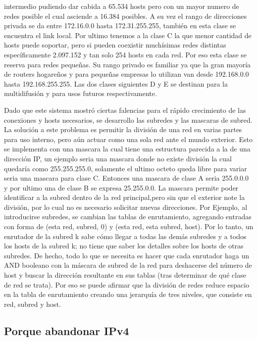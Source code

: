 \documentclass[11pt,a4paper]{article}
\begin{document}
intermedio pudiendo dar cabida a 65.534 hosts pero con un mayor numero de redes posible el cual 
asciende a 16.384 posibles. A su vez el rango de direcciones privada se da entre 172.16.0.0 hasta 
172.31.255.255, también en esta clase se encuentra el link local. Por ultimo tenemos a la clase C la
que menor cantidad de hosts puede soportar, pero si pueden coexistir muchísimas redes distintas 
específicamente 2.097.152 y tan solo 254 hosts en cada red. Por eso esta clase se reserva para redes 
pequeñas. Su rango privado es familiar ya que la gran mayoría de routers hogareños y para pequeñas 
empresas lo utilizan van desde 192.168.0.0 hasta 192.168.255.255. Las dos clases siguientes D y E se
destinan para la multidifusi\'on y para usos futuros respectivamente.\par
Dado que este sistema mostró ciertas falencias para el rápido crecimiento de las conexiones y hosts
necesarios, se desarrollo las subredes y las mascaras de subred. La solución a este problema es 
permitir la división de una red en varias partes para uso interno, pero aún actuar como una sola red 
ante el mundo exterior. Esto se implementa con una mascara la cual tiene una estructura parecida a
la de una dirección IP, un ejemplo seria una mascara donde no existe división la cual quedaría como 
255.255.255.0, solamente el ultimo octeto queda libre para variar seria una mascara para clase C. 
Entonces una mascara de clase A seria 255.0.0.0 y por ultimo una de clase B se expresa 25.255.0.0. 
La mascara permite poder identificar a la subred dentro de la red principal,pero sin que el exterior 
note la división, por lo cual no es necesario solicitar nuevas direcciones. Por Ejemplo, al 
introducirse subredes, se cambian las tablas de enrutamiento, agregando entradas con forma de (esta 
red, subred, 0) y (esta red, esta subred, host). Por lo tanto, un enrutador de la subred k sabe cómo 
llegar a todas las demás subredes y a todos los hosts de la subred k; no tiene que saber los 
detalles sobre los hosts de otras subredes. De hecho, todo lo que se necesita es hacer que cada 
enrutador haga un AND booleano con la máscara de subred de la red para deshacerse del número de host 
y buscar la dirección resultante en sus tablas (tras determinar de qué clase de red se trata). Por 
eso se puede afirmar que la división de redes reduce espacio en la tabla de enrutamiento creando una 
jerarquía de tres niveles, que consiste en red, subred y host.

\subsection{Porque abandonar IPv4}
\end{document}
